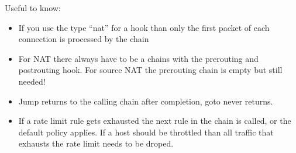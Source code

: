 \documentclass{report}
\begin{document}
Useful to know:

\begin{itemize}
\item
  If you use the type ``nat'' for a hook than only the first packet of
  each connection is processed by the chain
\item
  For NAT there always have to be a chains with the prerouting and
  postrouting hook. For source NAT the prerouting chain is empty but
  still needed!
\item
  Jump returns to the calling chain after completion, goto never
  returns.
\item
  If a rate limit rule gets exhausted the next rule in the chain is
  called, or the default policy applies. If a host should be throttled
  than all traffic that exhausts the rate limit needs to be droped.

\end{itemize}
\end{document}
